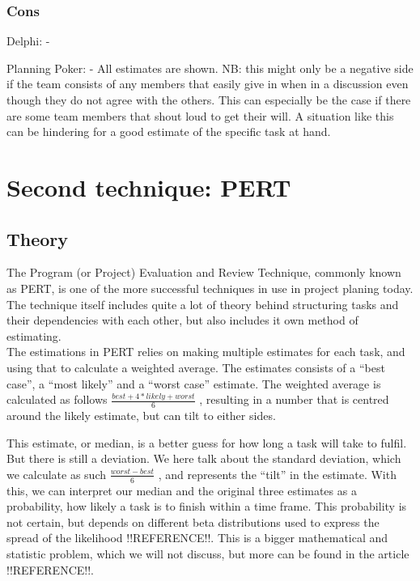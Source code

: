 \subsubsection{Cons}

Delphi:
- 

Planning Poker:
- All estimates are shown. NB: this might only be a negative side if the team consists of any members that easily give in when in a discussion even though they do not agree with the others. This can especially be the case if there are some team members that shout loud to get their will. A situation like this can be hindering for a good estimate of the specific task at hand.

\section{Second technique: PERT}
\subsection{Theory}

The Program (or Project) Evaluation and Review Technique, commonly known as PERT, is one of the more successful techniques in use in project planing today. The technique itself includes quite a lot of theory behind structuring tasks and their dependencies with each other, but also includes it own method of estimating.\\

The estimations in PERT relies on making multiple estimates for each task, and using that to calculate a weighted average. The estimates consists of a ``best case'', a ``most likely'' and a ``worst case'' estimate. The weighted average is calculated as follows
$\frac{best+4*likely+worst}{6}$
, resulting in a number that is centred around the likely estimate, but can tilt to either sides.\
 
This estimate, or median, is a better guess for how long a task will take to fulfil. But there is still a deviation. We here talk about the standard deviation, which we calculate as such
$\frac{worst-best}{6}$
, and represents the ``tilt'' in the estimate. With this, we can interpret our median and the original three estimates as a probability, how likely a task is to finish within a time frame. This probability is not certain, but depends on different beta distributions used to express the spread of the likelihood !!REFERENCE!!. This is a bigger mathematical and statistic problem, which we will not discuss, but more can be found in the article !!REFERENCE!!.\

